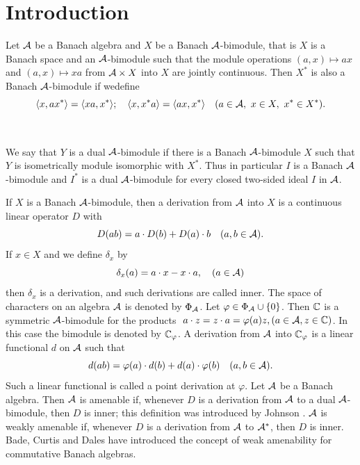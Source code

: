 \documentclass[fleqn]{mat01}
\begin{document}

\maketitle

\section{Introduction}

Let $\cal A$ be a Banach algebra and $X$ be a Banach $\cal A$-bimodule,
that is $X$ is a Banach space and an $\cal A$-bimodule such that the
module operations $(a,x)\longmapsto ax$ and $(a,x)\longmapsto xa$ from
${\cal A}\times X$ into $X$ are jointly continuous. Then $X^*$ is also a
Banach $\cal A$-bimodule if we\break define
\begin{equation*}
\langle x,ax^*\rangle =\langle xa,x^* \rangle;\quad \langle
x,x^*a\rangle = \langle ax,x^*\rangle\quad (a\in {\cal A}, ~x\in
X,~x^*\in X^*).
\end{equation*}

$\left.\right.$\vspace{-1.5pc}

We say that $Y$ is a dual $\cal A$-bimodule if there is a Banach $\cal
A$-bimodule $X$ such that $Y$ is isometrically module isomorphic with
$X^*$. Thus in particular $I$ is a Banach $\cal A$-bimodule and $I^*$ is
a dual $\cal A$-bimodule for every closed two-sided ideal $I$ in $\cal
A$.

If $X$ is  a Banach $\cal A$-bimodule, then a derivation from
$\cal A$ into $X$ is a continuous linear operator $D$ with
\begin{equation*}
D(ab)=a\cdot D(b)+D(a)\cdot b\quad (a,b\in {\cal A}).
\end{equation*}
If $x\in X$ and we define $\delta_x$ by
\begin{equation*}
\delta_x(a)=a\cdot x-x\cdot a,\quad (a\in {\cal A})
\end{equation*}
then $\delta_x$ is a derivation, and such derivations are called inner.
The space of characters on an algebra $\cal A$ is denoted by $\Phi_{\cal
A}$. Let $\varphi\in \Phi_{\cal A}\cup \{0\}$. Then $\Bbb C$ is a
symmetric $\cal A$-bimodule for the products $~a\cdot z=z\cdot
a=\varphi(a)z, (a\in {\cal A} ,z\in \Bbb C)$. In this case the bimodule
is denoted by $\Bbb C_\varphi$. A derivation from $\cal A$ into $\Bbb
C_\varphi$ is a linear functional $d$ on $\cal A$ such that
\begin{equation*}
d(ab)=\varphi(a)\cdot d(b)+d(a)\cdot \varphi(b) \quad (a,b\in {\cal A}).
\end{equation*}
Such a linear functional is called a point derivation at $\varphi$. Let
$\cal A$ be a Banach algebra. Then $\cal A$ is amenable if, whenever $D$
is a derivation from $\cal A$ to a dual $\cal A$-bimodule, then $D$ is
inner; this definition was introduced by Johnson \cite{Jo1}. $\cal
A$ is weakly amenable if, whenever $D$ is a derivation from $\cal A$ to
${\cal A}^*$, then $D$ is inner. Bade, Curtis and Dales \cite{B-C-D} have
introduced the concept of weak amenability for commutative Banach\break
algebras.
\end{document}
